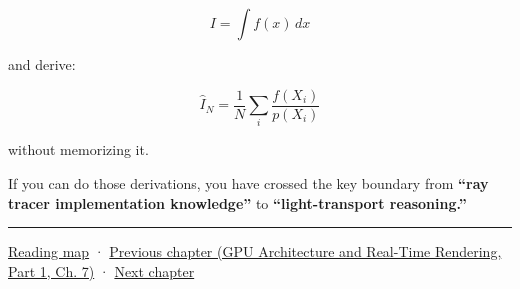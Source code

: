 \[
I=\int f(x)\,dx
\]

and derive:

\[
\boxed{
\hat I_N
=
\frac1N
\sum_i
\frac{f(X_i)}{p(X_i)}
}
\]

without memorizing it.

If you can do those derivations, you have crossed the key boundary from \textbf{``ray tracer implementation knowledge''} to \textbf{``light-transport reasoning.''}

\begin{center}\rule{0.5\linewidth}{0.5pt}\end{center}

\hyperref[volume-reading-map]{Reading map} · \href{../06-GPU-Architecture-and-Real-Time-Rendering-P01/main.pdf\#nameddest=03-visual-computing-i-ch006-from-material-data-to-gpu-bindings}{Previous chapter (GPU Architecture and Real-Time Rendering, Part 1, Ch. 7)} · \hyperref[03-visual-computing-i-ch008-sampling-directions-and-light-transport]{Next chapter}
